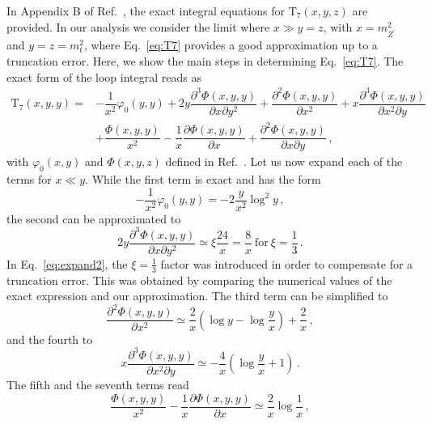 \documentclass[12pt]{report}
\newcommand{\ro}[1]{\textrm{#1}}
\renewcommand{\(}{\left(}
\renewcommand{\)}{\right)}
\renewcommand{\[}{\left[}
\renewcommand{\]}{\right]}
\newcommand{\del}{\partial}
\begin{document}
{{{{In Appendix B of Ref.~\cite{Feng:2009gn}, the exact integral equations for $\ro{T}_7\(x,y,z\)$ are provided. 
In our analysis we consider the limit where $x \gg y = z$, with $x = m_{Z^\prime}^2$ and $y = z = m_t^2$, 
where Eq.~\eqref{eq:T7} provides a good approximation up to a truncation error. Here, we show the main steps 
in determining Eq.~\eqref{eq:T7}. The exact form of the loop integral reads as
\begin{equation}
\begin{aligned}
    \ro{T}_7\(x,y,y\) =& -\dfrac{1}{x^2} \varphi_0\(y,y\) + 2 y \dfrac{\del^3 \Phi(x,y,y)}{\del x \del y^2} + \dfrac{\del^2 \Phi(x,y,y)}{\del x^2} + x \dfrac{\del^3 \Phi(x,y,y)}{\del x^2 \del y} \\
    & + \dfrac{\Phi(x,y,y)}{x^2}
    -\dfrac{1}{x} \dfrac{\del \Phi(x,y,y)}{\del x}
    + \dfrac{\del^2 \Phi(x,y,y)}{\del x \del y} \,,
\end{aligned}    
\label{eq:T7-Integrals}
\end{equation}
with $\varphi_0 (x,y)$ and $\Phi(x,y,z)$ defined in Ref.~\cite{Feng:2009gn}. Let us now expand 
each of the terms for $x \ll y$. While the first term is exact and has the form
\begin{equation}
    -\dfrac{1}{x^2} \varphi_0\(y,y\) = -2 \dfrac{y}{x^2} \log^2 y \,,
    \label{eq:expand1}
\end{equation}
the second can be approximated to
\begin{equation}
    2 y \dfrac{\del^3 \Phi(x,y,y)}{\del x \del y^2} \simeq \xi \dfrac{24}{x} = \dfrac{8}{x} ~\textrm{for}~ \xi = \dfrac{1}{3}\,.
    \label{eq:expand2}
\end{equation}
In Eq.~\eqref{eq:expand2}, the $\xi = \tfrac{1}{3}$ factor was introduced in order to compensate for a truncation error. This was obtained by comparing the numerical values of the exact expression and our approximation. The third term can be simplified to
\begin{equation}
    \dfrac{\del^2 \Phi(x,y,y)}{\del x^2} \simeq \dfrac{2}{x} \( \log y - \log \dfrac{y}{x} \) + \dfrac{2}{x} \,,
    \label{eq:expand3}
\end{equation}
and the fourth to
\begin{equation}
    x \dfrac{\del^3 \Phi(x,y,y)}{\del x^2 \del y} \simeq -\dfrac{4}{x}\(\log \dfrac{y}{x} + 1 \)\,.
    \label{eq:expand4}
\end{equation}
The fifth and the seventh terms read
\begin{equation}
    \dfrac{\Phi(x,y,y)}{x^2}
    -\dfrac{1}{x} \dfrac{\del \Phi(x,y,y)}{\del x} \simeq \dfrac{2}{x} \log \dfrac{1}{x} \,,

\end{equation}}}}}
\end{document}
